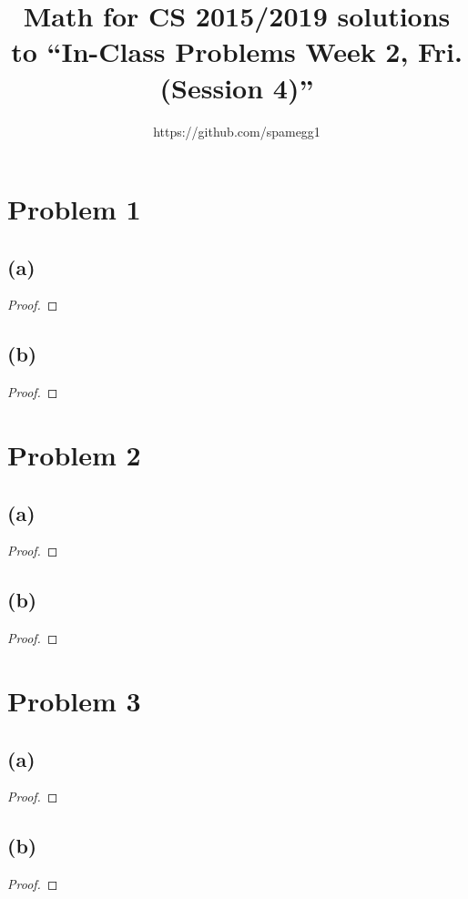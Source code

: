 \documentclass[14pt]{extarticle}
\title{Math for CS 2015/2019 solutions to ``In-Class Problems Week 2, Fri. (Session 4)''}
\author{https://github.com/spamegg1}
\begin{document}
\maketitle
\tableofcontents

\section{Problem 1}
\subsection{(a)}
\begin{proof}
\end{proof}

\subsection{(b)}
\begin{proof}
\end{proof}

\section{Problem 2}
\subsection{(a)}
\begin{proof}
\end{proof}

\subsection{(b)}
\begin{proof}
\end{proof}

\section{Problem 3}
\subsection{(a)}
\begin{proof}
\end{proof}

\subsection{(b)}
\begin{proof}
\end{proof}
\end{document}
